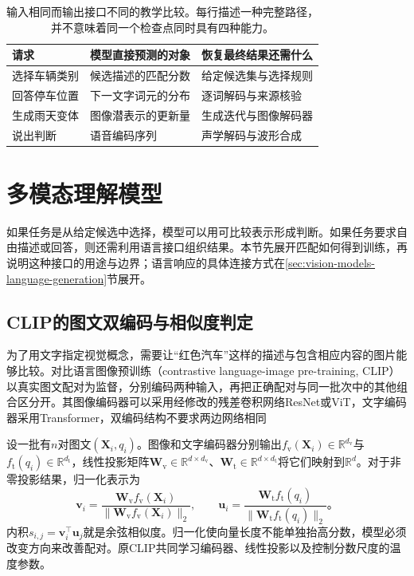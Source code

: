\begin{table}[htbp]
  \centering
  \small
  \begin{tabularx}{\linewidth}{@{}p{22mm}XX@{}}
    \toprule
    请求 & 模型直接预测的对象 & 恢复最终结果还需什么\\
    \midrule
    选择车辆类别 & 候选描述的匹配分数 & 给定候选集与选择规则\\
    回答停车位置 & 下一文字词元的分布 & 逐词解码与来源核验\\
    生成雨天变体 & 图像潜表示的更新量 & 生成迭代与图像解码器\\
    说出判断 & 语音编码序列 & 声学解码与波形合成\\
    \bottomrule
  \end{tabularx}
  \caption{输入相同而输出接口不同的教学比较。每行描述一种完整路径，并不意味着同一个检查点同时具有四种能力。}
  \label{tab:vision-model-interfaces}
\end{table}
\FloatBarrier

\section{多模态理解模型}
\label{sec:vision-models-understanding}

如果任务是从给定候选中选择，模型可以用可比较表示形成判断。如果任务要求自由描述或回答，则还需利用语言接口组织结果。本节先展开匹配如何得到训练，再说明这种接口的用途与边界；语言响应的具体连接方式在\ref{sec:vision-models-language-generation}节展开。

\subsection{CLIP的图文双编码与相似度判定}
\label{sec:vision-models-contrastive}

为了用文字指定视觉概念，需要让“红色汽车”这样的描述与包含相应内容的图片能够比较。对比语言图像预训练（contrastive language-image pre-training, CLIP）以真实图文配对为监督，分别编码两种输入，再把正确配对与同一批次中的其他组合区分开。其图像编码器可以采用经修改的残差卷积网络ResNet或ViT，文字编码器采用Transformer，双编码结构不要求两边网络相同

设一批有$n$对图文$(\bm{X}_i,q_i)$。图像和文字编码器分别输出$f_{\mathrm v}(\bm{X}_i)\in\mathbb R^{d_{\mathrm v}}$与$f_{\mathrm t}(q_i)\in\mathbb R^{d_{\mathrm t}}$，线性投影矩阵$\bm{W}_{\mathrm v}\in\mathbb R^{d\times d_{\mathrm v}}$、$\bm{W}_{\mathrm t}\in\mathbb R^{d\times d_{\mathrm t}}$将它们映射到$\mathbb{R}^d$。对于非零投影结果，归一化表示为
\begin{equation}
  \bm{v}_i=\frac{\bm{W}_{\mathrm v}f_{\mathrm v}(\bm{X}_i)}
                    {\lVert\bm{W}_{\mathrm v}f_{\mathrm v}(\bm{X}_i)\rVert_2},
  \qquad
  \bm{u}_i=\frac{\bm{W}_{\mathrm t}f_{\mathrm t}(q_i)}
                    {\lVert\bm{W}_{\mathrm t}f_{\mathrm t}(q_i)\rVert_2}\text{。}
  \label{eq:vision-clip-embedding}
\end{equation}
内积$s_{i,j}=\bm{v}_i^\top\bm{u}_j$就是余弦相似度。归一化使向量长度不能单独抬高分数，模型必须改变方向来改善配对。原CLIP共同学习编码器、线性投影以及控制分数尺度的温度参数。

